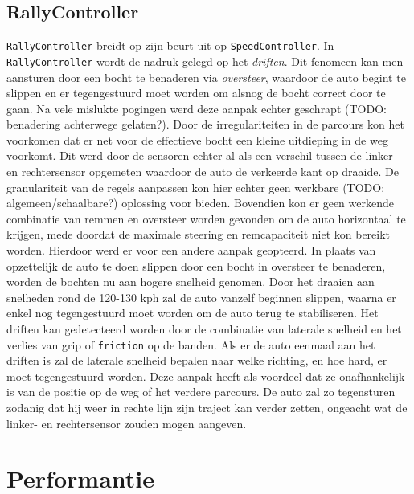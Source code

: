 \documentclass[10pt,a4paper]{article}
\begin{document}
		\subsection{RallyController}
			\texttt{RallyController} breidt op zijn beurt uit op \texttt{SpeedController}. In \texttt{RallyController} wordt de nadruk gelegd op het \textit{driften}. Dit fenomeen kan men aansturen door een bocht te benaderen via \textit{oversteer}, waardoor de auto begint te slippen en er tegengestuurd moet worden om alsnog de bocht correct door te gaan. Na vele mislukte pogingen werd deze aanpak echter geschrapt (TODO: benadering achterwege gelaten?). Door de irregulariteiten in de parcours kon het voorkomen dat er net voor de effectieve bocht een kleine uitdieping in de weg voorkomt. Dit werd door de sensoren echter al als een verschil tussen de linker- en rechtersensor opgemeten waardoor de auto de verkeerde kant op draaide. De granulariteit van de regels aanpassen kon hier echter geen werkbare (TODO: algemeen/schaalbare?) oplossing voor bieden. Bovendien kon er geen werkende combinatie van remmen en oversteer worden gevonden om de auto horizontaal te krijgen, mede doordat de maximale steering en remcapaciteit niet kon bereikt worden. Hierdoor werd er voor een andere aanpak geopteerd. In plaats van opzettelijk de auto te doen slippen door een bocht in oversteer te benaderen, worden de bochten nu aan hogere snelheid genomen. Door het draaien aan snelheden rond de 120-130 kph zal de auto vanzelf beginnen slippen, waarna er enkel nog tegengestuurd moet worden om de auto terug te stabiliseren. Het driften kan gedetecteerd worden door de combinatie van laterale snelheid en het verlies van grip of \texttt{friction} op de banden. Als er de auto eenmaal aan het driften is zal de laterale snelheid bepalen naar welke richting, en hoe hard, er moet tegengestuurd worden. Deze aanpak heeft als voordeel dat ze onafhankelijk is van de positie op de weg of het verdere parcours. De auto zal zo tegensturen zodanig dat hij weer in rechte lijn zijn traject kan verder zetten, ongeacht wat de linker- en rechtersensor zouden mogen aangeven. \\

	\section{Performantie}
\end{document}
